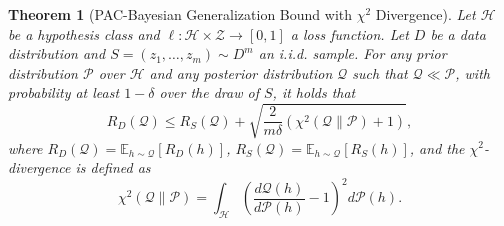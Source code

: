 \documentclass[10pt,a4paper]{amsart}
\newtheorem{theorem}{Theorem}
\begin{document}
\begin{theorem}[PAC-Bayesian Generalization Bound with $\chi^2$ Divergence]
Let $\mathcal{H}$ be a hypothesis class and $\ell: \mathcal{H} \times \mathcal{Z} \to [0,1]$ a loss function. Let $D$ be a data distribution and $S = (z_1, \dots, z_m) \sim D^m$ an i.i.d. sample. For any prior distribution $\mathcal{P}$ over $\mathcal{H}$ and any posterior distribution $\mathcal{Q}$ such that $\mathcal{Q} \ll \mathcal{P}$, with probability at least $1 - \delta$ over the draw of $S$, it holds that
\begin{equation}
    R_D(\mathcal{Q}) \leq R_S(\mathcal{Q}) + \sqrt{ \frac{2}{m\delta} \left( \chi^2(\mathcal{Q} \| \mathcal{P}) + 1 \right)  },
\end{equation}
where $R_D(\mathcal{Q}) = \mathbb{E}_{h \sim \mathcal{Q}}[R_D(h)]$, $R_S(\mathcal{Q}) = \mathbb{E}_{h \sim \mathcal{Q}}[R_S(h)]$, and the $\chi^2$-divergence is defined as
\begin{equation}
    \chi^2(\mathcal{Q} \| \mathcal{P}) = \int_{\mathcal{H}} \left( \frac{d\mathcal{Q}(h)}{d\mathcal{P}(h)} - 1 \right)^2 d\mathcal{P}(h).
\end{equation}
\end{theorem}
\end{document}
